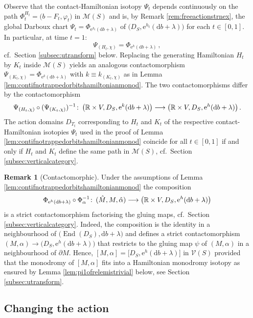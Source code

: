 \documentclass{amsart}
\theoremstyle{definition}
\newtheorem{rem}[prop]{Remark}
\def\co{\colon\thinspace}
\newcommand{\rmd}{\mathrm d}
\newcommand{\rme}{\mathrm e}
\newcommand{\MM}{\mathcal M}
\newcommand{\R}{\mathbb R}
\newcommand{\VV}{\mathcal V}
\newcommand{\lra}{\longrightarrow}
\newcommand{\ra}{\rightarrow}
\DeclareMathOperator{\End}{\mathrm{End}}
\begin{document}
Observe that the contact-Hamiltonian isotopy $\Psi_t$
depends continuously on the path
$\Phi_t^{H_t}=\big(b-F_t,\varphi_t\big)$ in $\MM(S)$
and is, by Remark \ref{rem:freeactionstrnex},
the global Darboux chart
$\Psi_t=\Phi_{\rme^{h_t}(\rmd b+\lambda)}$ 
of $\big(D_S,\rme^{h_t}(\rmd b+\lambda)\big)$
for each $t\in[0,1]$.
In particular, at time $t=1$:
\[
\Psi_{(H_t,\chi)}=\Phi_{\rme^h(\rmd b+\lambda)}
\,,
\]
cf.\ Section \ref{subsec:utransform} below.
Replacing the generating Hamiltonian $H_t$
by $K_t$ inside $\MM(S)$ yields
an analogous contactomorphism
$\Psi_{(K_t,\chi)}=\Phi_{\rme^k(\rmd b+\lambda)}$
with $k\equiv k_{(K_t,\chi)}$ as in Lemma
\ref{lem:contifnotrappedorbitshamiltonianmonod}.
The two contactomorphisms
differ by the contactomorphism
\[
  \Psi_{(H_t,\chi)}\circ(\Psi_{(K_t,\chi)})^{-1}\co
  \big(\R\times V,D_S,\rme^k(\rmd b+\lambda)\big)
  \lra
  \big(\R\times V,D_S,\rme^h(\rmd b+\lambda)\big)
  \,.
\]
The action domains $D_{T_t}$ corresponding to $H_t$ and $K_t$
of the respective contact-Hamiltonian isotopies $\Psi_t$
used in the proof of Lemma
\ref{lem:contifnotrappedorbitshamiltonianmonod}
coincide for all $t\in[0,1]$ if and only if
$H_t$ and $K_t$ define the same path in $\MM(S)$,
cf.\ Section \ref{subsec:verticalcategory}.


\begin{rem}[Contactomorphic]
\label{rem:contifnotrappedorbitshamiltonianmonod}
Under the assumptions of Lemma
\ref{lem:contifnotrappedorbitshamiltonianmonod}
the composition
\[
 \Phi_{\rme^h(\rmd b+\lambda)}\circ\Phi_{\alpha}^{-1}\co
 (\hat{M},M,\hat{\alpha})
 \lra
 \big(\R\times V,D_S,\rme^h(\rmd b+\lambda)\big)
\]
is a strict contactomorphism factorising the gluing maps,
cf.\ Section \ref{subsec:verticalcategory}.
Indeed, the composition is the identity in a neighbourhood of
$\big(\!\End(D_S),\rmd b+\lambda\big)$ and
defines a strict contactomorphism
$(M,\alpha)\ra\big(D_S,\rme^h(\rmd b+\lambda)\big)$ that
restricts to the gluing map
$\psi$ of $(M,\alpha)$ in a neighbourhood of $\partial M$.
Hence,
$[M,\alpha]=\big[D_S,\rme^h(\rmd b+\lambda)\big]$
in $\VV(S)$ provided that the monodromy of $[M,\alpha]$
fits into a Hamiltonian monodromy isotopy
as ensured by Lemma \ref{lem:pi1ofrelemistrivial} below,
see Section \ref{subsec:utransform}.
\end{rem}




\subsection{Changing the action}
\label{subsec:changingtheaction}
\end{document}
